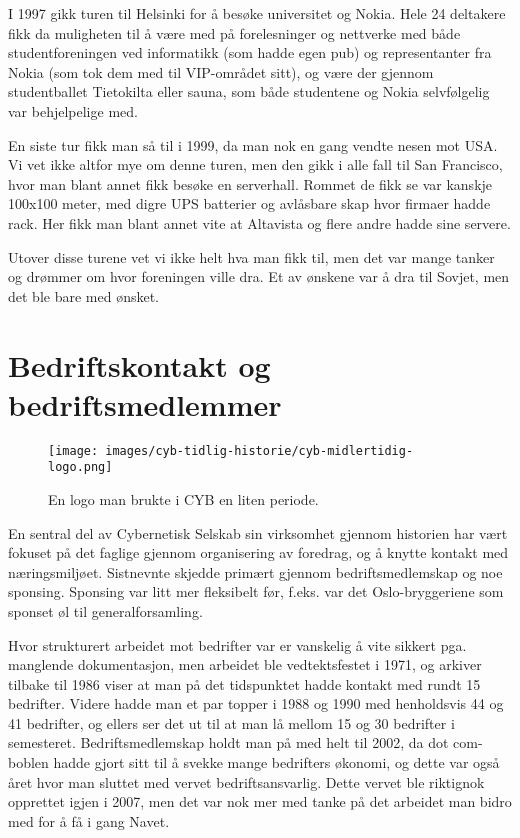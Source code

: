 I 1997 gikk turen til Helsinki for å besøke universitet og Nokia. Hele 24 deltakere fikk da muligheten til å være med på forelesninger og nettverke med både studentforeningen ved informatikk (som hadde egen pub) og representanter fra Nokia (som tok dem med til VIP-området sitt), og være der gjennom studentballet Tietokilta eller sauna, som både studentene og Nokia selvfølgelig var behjelpelige med.

En siste tur fikk man så til i 1999, da man nok en gang vendte nesen mot USA. Vi vet ikke altfor mye om denne turen, men den gikk i alle fall til San Francisco, hvor man blant annet fikk besøke en serverhall. Rommet de fikk se var kanskje 100x100 meter, med digre UPS batterier og avlåsbare skap hvor firmaer hadde rack. Her fikk man blant annet vite at Altavista og flere andre hadde sine servere.

Utover disse turene vet vi ikke helt hva man fikk til, men det var mange tanker og drømmer om hvor foreningen ville dra. Et av ønskene var å dra til Sovjet, men det ble bare med ønsket.

\section{Bedriftskontakt og bedriftsmedlemmer}

\begin{wrapfigure}{r}{7cm}
	\vspace{-20pt}
	\centering
	\texttt{[image: images/cyb-tidlig-historie/cyb-midlertidig-logo.png]}
	\label{fig:buss}
	\caption{En logo man brukte i CYB en liten periode.}
\end{wrapfigure}

En sentral del av Cybernetisk Selskab sin virksomhet gjennom historien har vært fokuset på det faglige gjennom organisering av foredrag, og å knytte kontakt med næringsmiljøet. Sistnevnte skjedde primært gjennom bedriftsmedlemskap og noe sponsing. Sponsing var litt mer fleksibelt før, f.eks. var det Oslo-bryggeriene som sponset øl til generalforsamling.

Hvor strukturert arbeidet mot bedrifter var er vanskelig å vite sikkert pga. manglende dokumentasjon, men arbeidet ble vedtektsfestet i 1971, og arkiver tilbake til 1986 viser at man på det tidspunktet hadde kontakt med rundt 15 bedrifter. Videre hadde man et par topper i 1988 og 1990 med henholdsvis 44 og 41 bedrifter, og ellers ser det ut til at man lå mellom 15 og 30 bedrifter i semesteret. Bedriftsmedlemskap holdt man på med helt til 2002, da dot com-boblen hadde gjort sitt til å svekke mange bedrifters økonomi, og dette var også året hvor man sluttet med vervet bedriftsansvarlig. Dette vervet ble riktignok opprettet igjen i 2007, men det var nok mer med tanke på det arbeidet man bidro med for å få i gang Navet.

